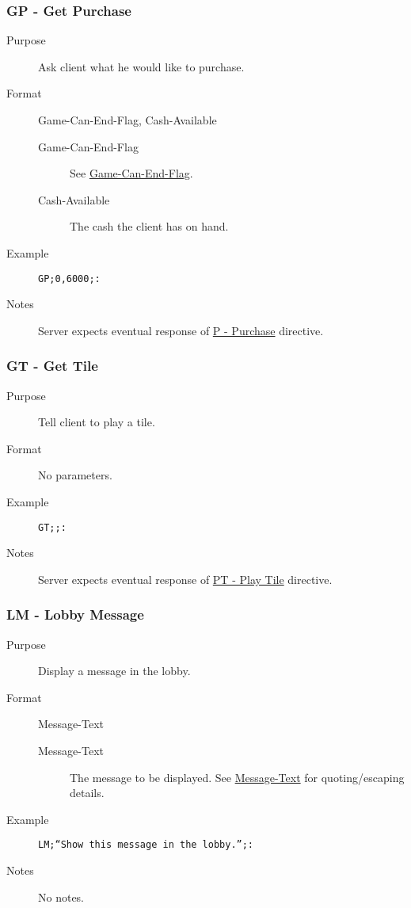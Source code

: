 \documentclass{article}
\providecommand{\wiredata}[1]{\texttt{{#1}}}
\begin{document}

\subsubsection{GP - Get Purchase} %
\label{ssub:gp_get_purchase}

\begin{description}
  \item[Purpose] Ask client what he would like to purchase.
  \item[Format] Game-Can-End-Flag, Cash-Available
  \begin{description}
    \item[Game-Can-End-Flag] See \hyperref[ssub:game_can_end_flag]{Game-Can-End-Flag}.
    \item[Cash-Available] The cash the client has on hand.
  \end{description}
  \item[Example] \wiredata{GP;0,6000;:}
  \item[Notes] Server expects eventual response of \hyperref[ssub:p_purchase]{P - Purchase} directive.
\end{description}


\subsubsection{GT - Get Tile} %
\label{ssub:gt_get_tile}

\begin{description}
  \item[Purpose] Tell client to play a tile.
  \item[Format] No parameters.
  \item[Example] \wiredata{GT;;:}
  \item[Notes] Server expects eventual response of \hyperref[ssub:pt_play_tile]{PT - Play Tile} directive.
\end{description}


\subsubsection{LM - Lobby Message} %
\label{ssub:lm_lobby_message}

\begin{description}
  \item[Purpose] Display a message in the lobby.
  \item[Format] Message-Text
  \begin{description}
    \item[Message-Text] The message to be displayed. See \hyperref[ssub:message_text]{Message-Text} for quoting/escaping details.
  \end{description}
  \item[Example] \wiredata{LM;``Show this message in the lobby.'';:}
  \item[Notes] No notes.
\end{description}
\end{document}
